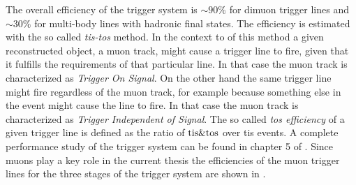 The overall efficiency of the \lhcb trigger system is $\sim 90\%$ for dimuon trigger lines and $\sim 30\%$ 
for multi-body lines with hadronic final states. The efficiency is estimated with the so called {\it tis-tos} 
method. In the context to of this method a given reconstructed object, \ie a muon track, might cause a 
trigger line to fire, given that it fulfills the requirements of that particular line. In that case the 
muon track is characterized as {\it Trigger On Signal}. On the other hand the same trigger line might 
fire regardless of the muon track, for example because something else in the event might cause the line 
to fire. In that case the muon track is characterized as {\it Trigger Independent of Signal}. 
The so called {\it tos efficiency} of a given trigger line is defined as the ratio of ${\rm tis}\&{\rm tos}$ 
over tis events. A complete performance study of the trigger system can be found in chapter 5 
of \cite{Aaij:2014jba}. Since muons play a key role in the current thesis the efficiencies of the muon 
trigger lines for the three stages of the \lhcb trigger system are  shown in .

